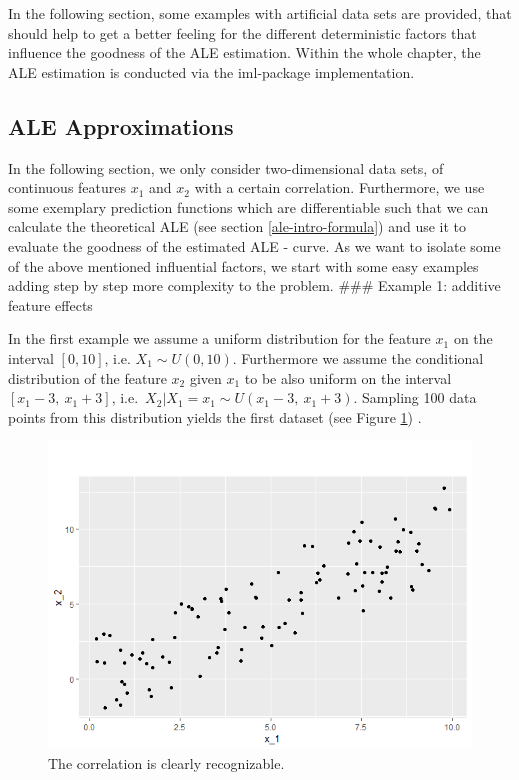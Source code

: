 \documentclass[
]{krantz}
\begin{document}
In the following section, some examples with artificial data sets are provided, that should help to get a better feeling for the different deterministic factors that influence the goodness of the ALE estimation. Within the whole chapter, the ALE estimation is conducted via the iml-package implementation.

\hypertarget{ale-approximations}{%
\subsection{ALE Approximations}\label{ale-approximations}}

In the following section, we only consider two-dimensional data sets, of continuous features \(x_1\) and \(x_2\) with a certain correlation. Furthermore, we use some exemplary prediction functions which are differentiable such that we can calculate the theoretical ALE (see section \ref{ale-intro-formula}) and use it to evaluate the goodness of the estimated ALE - curve. As we want to isolate some of the above mentioned influential factors, we start with some easy examples adding step by step more complexity to the problem.
\#\#\# Example 1: additive feature effects

In the first example we assume a uniform distribution for the feature \(x_1\) on the interval \([0, 10]\), i.e.
\(X_1 \sim U(0,10)\). Furthermore we assume the conditional distribution of the feature \(x_2\) given \(x_1\) to be also uniform on the interval \([x_1 - 3,~x_1 + 3 ]\), i.e.~\(X_2 \vert X_1 = x_1 \sim U(x_1 - 3,~x_1 + 3 )\). Sampling 100 data points from this distribution yields the first dataset (see Figure \ref{fig:DatasetALE1}) .

\begin{figure}
\includegraphics[width=1\linewidth]{images/ALE_2_Dataset1_} \caption{The correlation is clearly recognizable.}\label{fig:DatasetALE1}
\end{figure}
\end{document}
